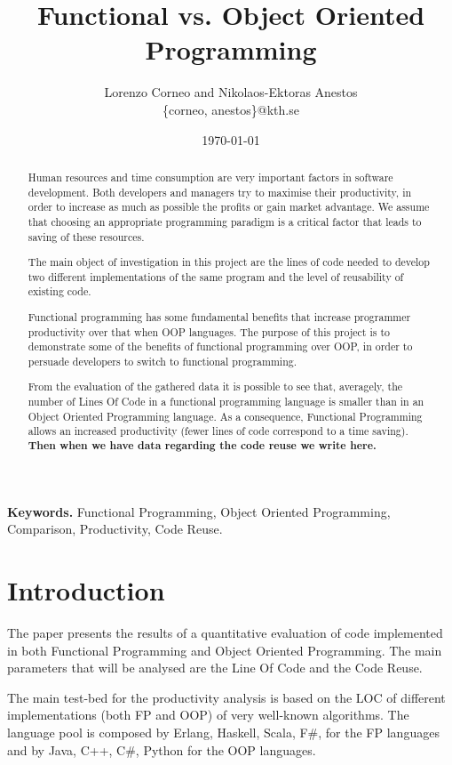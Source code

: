 \documentclass{proc}
\begin{document}
\title{Functional vs. Object Oriented Programming}
\author{Lorenzo Corneo and Nikolaos-Ektoras Anestos \\
	\{corneo, anestos\}@kth.se}
\date{\today}
\maketitle

\begin{abstract}
Human resources and time consumption are very important factors in software development. Both developers and managers try to maximise their productivity, in order to increase as much as possible the profits or gain market advantage. We assume that choosing an appropriate programming paradigm is a critical factor that leads to saving of these resources.

The main object of investigation in this project are the lines of code needed to develop two different implementations of the same program and the level of reusability of existing code.

Functional programming has some fundamental benefits that increase programmer productivity over that when OOP languages. The purpose of this project is to demonstrate some of the benefits of functional programming over OOP, in order to persuade developers to switch to functional programming.

From the evaluation of the gathered data it is possible to see that, averagely, the number of Lines Of Code in a functional programming language is smaller than in an Object Oriented Programming language. As a consequence, Functional Programming allows an increased productivity (fewer lines of code correspond to a time saving). \textbf{Then when we have data regarding the code reuse we write here.}
\end{abstract}

\smallskip
\noindent \textbf{Keywords.} Functional Programming, Object Oriented Programming, Comparison, Productivity, Code Reuse.

\section{Introduction}

The paper presents the results of a quantitative evaluation of code implemented in both Functional Programming and Object Oriented Programming. The main parameters that will be analysed are the Line Of Code and the Code Reuse.

The main test-bed for the productivity analysis is based on the LOC of different implementations (both FP and OOP) of very well-known algorithms. The language pool is composed by Erlang, Haskell, Scala, F\#, for the FP languages and by Java, C++, C\#, Python for the OOP languages.
\end{document}
